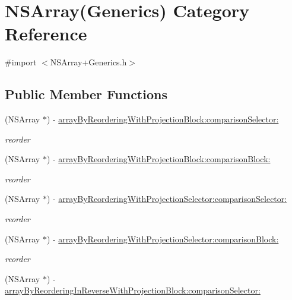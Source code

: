 \hypertarget{interface_n_s_array_07_generics_08}{\section{N\-S\-Array(Generics) Category Reference}
\label{interface_n_s_array_07_generics_08}
}


{\ttfamily \#import $<$N\-S\-Array+\-Generics.\-h$>$}

\subsection*{Public Member Functions}
\begin{DoxyCompactItemize}
\item 
(N\-S\-Array $\ast$) -\/ \hyperlink{interface_n_s_array_07_generics_08_a62da88994351b363028e76d83c1f597d}{array\-By\-Reordering\-With\-Projection\-Block\-:comparison\-Selector\-:}
\begin{DoxyCompactList}\small\item\em reorder \end{DoxyCompactList}\item 
(N\-S\-Array $\ast$) -\/ \hyperlink{interface_n_s_array_07_generics_08_a51f80d0e82b2348fe21478a2fa90d87d}{array\-By\-Reordering\-With\-Projection\-Block\-:comparison\-Block\-:}
\begin{DoxyCompactList}\small\item\em reorder \end{DoxyCompactList}\item 
(N\-S\-Array $\ast$) -\/ \hyperlink{interface_n_s_array_07_generics_08_a229079618fcb2604f587e4b89e686db8}{array\-By\-Reordering\-With\-Projection\-Selector\-:comparison\-Selector\-:}
\begin{DoxyCompactList}\small\item\em reorder \end{DoxyCompactList}\item 
(N\-S\-Array $\ast$) -\/ \hyperlink{interface_n_s_array_07_generics_08_ac139c8d90c144c246844718d4418258e}{array\-By\-Reordering\-With\-Projection\-Selector\-:comparison\-Block\-:}
\begin{DoxyCompactList}\small\item\em reorder \end{DoxyCompactList}\item 
(N\-S\-Array $\ast$) -\/ \hyperlink{interface_n_s_array_07_generics_08_a144f2c600d3719d554fa592dfbe7158b}{array\-By\-Reordering\-In\-Reverse\-With\-Projection\-Block\-:comparison\-Selector\-:}

\end{DoxyCompactItemize}
